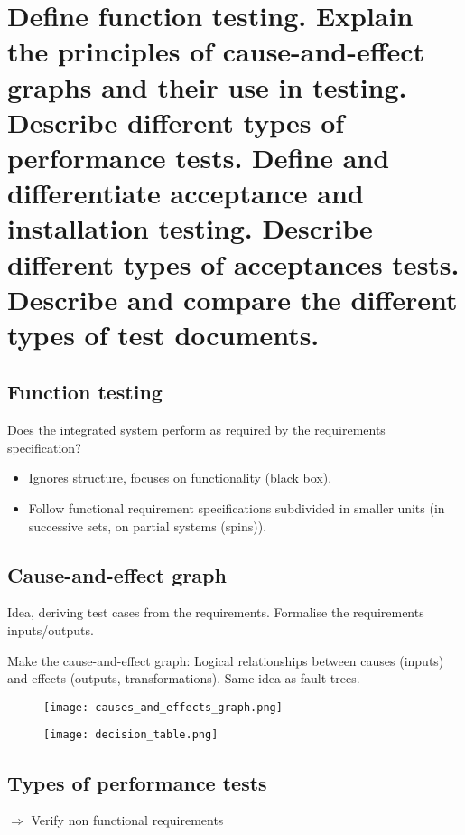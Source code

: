 \clearpage{}
\section{Define function testing. Explain the principles of cause-and-effect
graphs and their use in testing. Describe different types of performance
tests. Define and differentiate acceptance and installation testing.
Describe different types of acceptances tests. Describe and compare the
different types of test documents.}


\subsection{Function testing}

Does the integrated system perform as required by the requirements specification? 
\begin{itemize}

\item Ignores structure, focuses on functionality (black box). 
\item Follow functional requirement specifications subdivided in smaller
    units (in successive sets, on partial systems (spins)).
\end{itemize}

\subsection{Cause-and-effect graph}

Idea, deriving test cases from the requirements. Formalise the
requirements inputs/outputs. \newline

Make the cause-and-effect graph: Logical relationships between causes (inputs) and effects (outputs, transformations). Same idea as fault trees.

\begin{figure}[!ht]
    \centering
    \texttt{[image: causes\_and\_effects\_graph.png]}
\end{figure}

\begin{figure}[!ht]
    \centering
    \texttt{[image: decision\_table.png]}
\end{figure}

\subsection{Types of performance tests}
$\Rightarrow$ \textcolor{red!80!black}{Verify non functional requirements}

